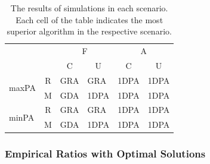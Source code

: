 \begin{table}[h]
\renewcommand{\arraystretch}{2}
\centering \vspace{-5pt}
\begin{tabular}{lc|l|l|l|l|}
\cline{3-6}
 & \multicolumn{1}{l|}{} & \multicolumn{2}{c|}{F} & \multicolumn{2}{c|}{A} \\ \hhline{~~|-|-|-|-|} %
 & \multicolumn{1}{l|}{} & \multicolumn{1}{c|}{C} & \multicolumn{1}{c|}{U} & \multicolumn{1}{c|}{C} & \multicolumn{1}{c|}{U} \\ \hline
\multicolumn{1}{|c|}{\multirow{2}{*}{{\sc maxPA}}} & R & GRA & GRA & \cellcolor[gray]{.8} 1DPA & \cellcolor[gray]{.8} 1DPA \\ \hhline{|~|-|-|-|-|-|} %
\multicolumn{1}{|c|}{} & M & GDA & \cellcolor[gray]{.8}1DPA &\cellcolor[gray]{.8} 1DPA &\cellcolor[gray]{.8}  1DPA \\ \hline
\multicolumn{1}{|l|}{\multirow{2}{*}{\sc minPA}} & R & GRA & GRA & \cellcolor[gray]{.8} 1DPA &\cellcolor[gray]{.8}  1DPA \\ \hhline{|~|-|-|-|-|-|}%
\multicolumn{1}{|l|}{} & M & GDA & \cellcolor[gray]{.8}  1DPA & \cellcolor[gray]{.8} 1DPA & \cellcolor[gray]{.8}  1DPA \\ \hline
\end{tabular} \vspace{-5pt}
\caption{The results of simulations in each scenario. Each cell of the table indicates the most superior algorithm in the respective scenario.}
\label{algorithmscomparison}
\end{table}

\vspace{-5pt}
\subsubsection{Empirical Ratios with Optimal Solutions}~\\

